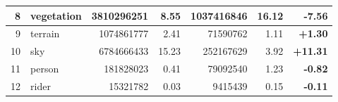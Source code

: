 \documentclass[a4paper,12pt]{report}
\begin{document}
\begin{table}[]
{\begin{tabular}{|r|l|r|r|r|r|r|}
            8                                                                                      & vegetation    & 3810296251                          & 8.55                                                                                   & 1037416846                                                                            & 16.12                                                                                       & \textbf{-7.56}                                                                                                   \\ \hline
            9                                                                                      & terrain       & 1074861777                          & 2.41                                                                                   & 71590762                                                                              & 1.11                                                                                        & \textbf{+1.30}                                                                                                   \\ \hline
            10                                                                                     & sky           & 6784666433                          & 15.23                                                                                  & 252167629                                                                             & 3.92                                                                                        & \textbf{+11.31}                                                                                                  \\ \hline
            11                                                                                     & person        & 181828023                           & 0.41                                                                                   & 79092540                                                                              & 1.23                                                                                        & \textbf{-0.82}                                                                                                   \\ \hline
            12                                                                                     & rider         & 15321782                            & 0.03                                                                                   & 9415439                                                                               & 0.15                                                                                        & \textbf{-0.11}                                                                                                   \\ \hline

\end{tabular}}
\end{table}
\end{document}
